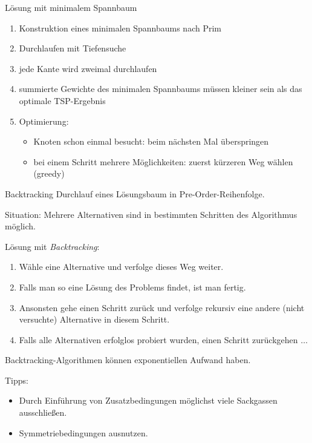 \documentclass[german]{../spicker}
\begin{document}
\begin{bonus}{Lösung mit minimalem Spannbaum}
    \begin{enumerate}
        \item Konstruktion eines minimalen Spannbaums nach Prim
        \item Durchlaufen mit Tiefensuche
        \item jede Kante wird zweimal durchlaufen
        \item summierte Gewichte des minimalen Spannbaums müssen kleiner sein als das optimale TSP-Ergebnis
        \item Optimierung:
              \begin{itemize}
                  \item Knoten schon einmal besucht: beim nächsten Mal überspringen
                  \item bei einem Schritt mehrere Möglichkeiten: zuerst kürzeren Weg wählen (greedy)
              \end{itemize}
    \end{enumerate}
\end{bonus}

\begin{defi}{Backtracking}
    Durchlauf eines Lösungsbaum in Pre-Order-Reihenfolge.

    Situation: Mehrere Alternativen sind in bestimmten Schritten des Algorithmus möglich.

    Lösung mit \emph{Backtracking}:
    \begin{enumerate}
        \item Wähle eine Alternative und verfolge dieses Weg weiter.
        \item Falls man so eine Lösung des Problems findet, ist man fertig.
        \item Ansonsten gehe einen Schritt zurück und verfolge rekursiv eine andere (nicht versuchte) Alternative in diesem Schritt.
        \item Falls alle Alternativen erfolglos probiert wurden, einen Schritt zurückgehen $\ldots$
    \end{enumerate}

    Backtracking-Algorithmen können exponentiellen Aufwand haben.

    Tipps:
    \begin{itemize}
        \item Durch Einführung von Zusatzbedingungen möglichst viele Sackgassen ausschließen.
        \item Symmetriebedingungen ausnutzen.
    \end{itemize}
\end{defi}
\end{document}

